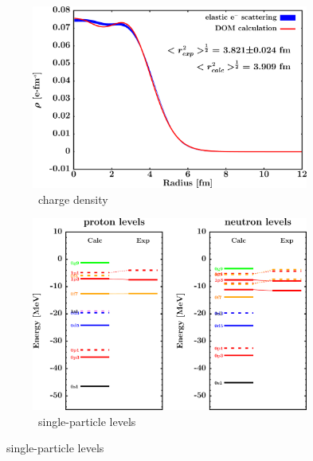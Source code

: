 \afterpage{\clearpage}
\begin{figure}[hbtp]
    \captionsetup[subfigure]{labelformat=empty}
    \centering
    \begin{subfigure}[b]{0.45\textwidth}
        \centering
        \includegraphics[width=\linewidth]{figures/ni64_chargeDensity.png}
        \caption{\niFour\ charge density}
        \label{DOMFitData_ni64_chargeDensity}
    \end{subfigure}\hspace{6pt}
    \begin{subfigure}[b]{0.45\textwidth}
        \centering
        \includegraphics[width=\linewidth]{figures/ni64_SPLevels.png}
        \caption{\niFour\ single-particle levels}
        \label{DOMFitData_ni64_SPLevels}
    \end{subfigure}\vspace{0.3in}

\end{figure}
